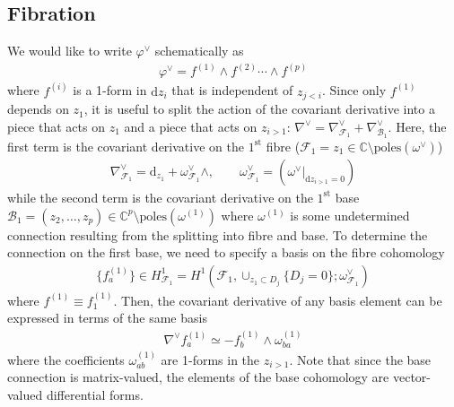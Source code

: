 \documentclass[11pt]{article}
\renewcommand{\d}{\text{d}}
\newcommand{\F}{\mathcal{F}}
\newcommand{\B}{\mathcal{B}}
\newcommand{\vphi}{\varphi}
\begin{document}
\subsection{Fibration \label{sec:fibration-gen}}

We would like to write $\vphi^\vee$ schematically as 
\begin{align}
	\vphi^\vee = f^{(1)} \wedge f^{(2)} \cdots \wedge f^{(p)}
\end{align} 
where $f^{(i)}$ is a 1-form in $\d z_i$ that is independent of $z_{j<i}$. Since only $f^{(1)}$ depends on $z_1$, it is useful to split the action of the covariant derivative into a piece that acts on $z_1$ and a piece that acts on $z_{i>1}$: $\nabla^\vee = \nabla^\vee_{\F_1} + \nabla^\vee_{\B_1}$. Here, the first term is the covariant derivative on the $1^\text{st}$ fibre ($\mathcal{F}_1 = z_1 \in \mathbb{C} \setminus \text{poles}(\omega^\vee)$)
\begin{align}
	\nabla^\vee_{\F_1} = \d_{z_1} + \omega_{\F_1}^\vee \wedge,
	\qquad 
	\omega_{\F_1}^\vee = (\omega^\vee \vert_{\d z_{i>1} = 0})
\end{align}
while the second term is the covariant derivative on the $1^\text{st}$ base $\B_1 = (z_2, \dots, z_p) \in \mathbb{C}^p \setminus \text{poles}(\omega^{(1)})$ where $\omega^{(1)}$ is some undetermined connection resulting from the splitting into fibre and base. To determine the connection on the first base, we need to specify a basis on the fibre cohomology
\begin{align}
	\{f_a^{(1)}\} \in H_{\F_1}^1 = H^1(\F_1, \cup_{z_1 \subset D_j} \{D_j=0\}; \omega_{\F_1}^\vee)
\end{align}
where $f^{(1)} \equiv f^{(1)}_1$. Then, the covariant derivative of any basis element can be expressed in terms of the same basis
\begin{align}
	\label{eq:f-base-connection}
	\nabla^\vee f^{(1)}_a 
	\simeq - f^{(1)}_b \wedge \omega^{(1)}_{ba}
\end{align}
where the coefficients $\omega_{ab}^{(1)}$ are 1-forms in the $z_{i>1}$. Note that since the base connection is matrix-valued, the elements of the base cohomology are vector-valued differential forms. 
\end{document}
